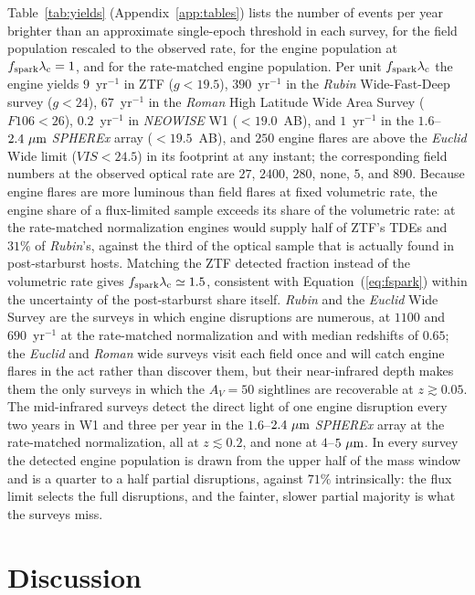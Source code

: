 \documentclass[twocolumn,pdftex]{aastex701}
\newcommand{\um}{\mu{\rm m}\xspace}
\newcommand{\lsst}{{\it Rubin}\xspace}
\newcommand{\neowise}{{\it NEOWISE}\xspace}
\newcommand{\romantel}{{\it Roman}\xspace}
\newcommand{\euclid}{{\it Euclid}\xspace}
\newcommand{\spherex}{{\it SPHEREx}\xspace}
\newcommand{\fspark}{f_{\rm spark}\xspace}
\newcommand{\lamc}{\lambda_{\rm c}\xspace}
\begin{document}
Table~\ref{tab:yields} (Appendix~\ref{app:tables}) lists the number of events per year brighter than an approximate single-epoch threshold in each survey, for the field population rescaled to the observed rate, for the engine population at $\fspark \lamc = 1$, and for the rate-matched engine population. Per unit $\fspark \lamc$ the engine yields $9$~yr$^{-1}$ in ZTF ($g < 19.5$), $390$~yr$^{-1}$ in the \lsst Wide-Fast-Deep survey ($g < 24$), $67$~yr$^{-1}$ in the \romantel High Latitude Wide Area Survey ($F106 < 26$), $0.2$~yr$^{-1}$ in \neowise W1 ($< 19.0$~AB), and $1$~yr$^{-1}$ in the $1.6$--$2.4~\um$ \spherex array ($< 19.5$~AB), and $250$ engine flares are above the \euclid Wide limit ($VIS < 24.5$) in its footprint at any instant; the corresponding field numbers at the observed optical rate are $27$, $2400$, $280$, none, $5$, and $890$. Because engine flares are more luminous than field flares at fixed volumetric rate, the engine share of a flux-limited sample exceeds its share of the volumetric rate: at the rate-matched normalization engines would supply half of ZTF's TDEs and $31\%$ of \lsst's, against the third of the optical sample that is actually found in post-starburst hosts. Matching the ZTF detected fraction instead of the volumetric rate gives $\fspark \lamc \simeq 1.5$, consistent with Equation~(\ref{eq:fspark}) within the uncertainty of the post-starburst share itself. \lsst and the \euclid Wide Survey are the surveys in which engine disruptions are numerous, at $1100$ and $690$~yr$^{-1}$ at the rate-matched normalization and with median redshifts of $0.65$; the \euclid and \romantel wide surveys visit each field once and will catch engine flares in the act rather than discover them, but their near-infrared depth makes them the only surveys in which the $A_V = 50$ sightlines are recoverable at $z \gtrsim 0.05$. The mid-infrared surveys detect the direct light of one engine disruption every two years in W1 and three per year in the $1.6$--$2.4~\um$ \spherex array at the rate-matched normalization, all at $z \lesssim 0.2$, and none at $4$--$5~\um$. In every survey the detected engine population is drawn from the upper half of the mass window and is a quarter to a half partial disruptions, against $71\%$ intrinsically: the flux limit selects the full disruptions, and the fainter, slower partial majority is what the surveys miss.

\section{Discussion}\label{sec:discussion}
\end{document}

